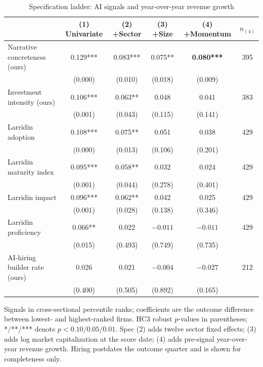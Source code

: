 \documentclass[11pt]{article}
\begin{document}
\begin{table}[t]
\centering
\begin{threeparttable}
\caption{Specification ladder: AI signals and year-over-year revenue growth}
\label{tab:ladder}
\small
\begin{tabular}{lccccc}
\toprule
 & (1) Univariate & (2) +Sector & (3) +Size & (4) +Momentum & $n_{(4)}$\\
\midrule
Narrative concreteness (ours) & 0.129*** & 0.083*** & 0.075** & \textbf{0.080***} & 395\\
 & (0.000) & (0.010) & (0.018) & (0.009) & \\
Investment intensity (ours) & 0.106*** & 0.063** & 0.048 & 0.041 & 383\\
 & (0.001) & (0.043) & (0.115) & (0.141) & \\
Larridin adoption & 0.108*** & 0.075** & 0.051 & 0.038 & 429\\
 & (0.000) & (0.013) & (0.106) & (0.201) & \\
Larridin maturity index & 0.095*** & 0.058** & 0.032 & 0.024 & 429\\
 & (0.001) & (0.044) & (0.278) & (0.401) & \\
Larridin impact & 0.096*** & 0.062** & 0.042 & 0.025 & 429\\
 & (0.001) & (0.028) & (0.138) & (0.346) & \\
Larridin proficiency & 0.066** & 0.022 & $-0.011$ & $-0.011$ & 429\\
 & (0.015) & (0.493) & (0.749) & (0.735) & \\
AI-hiring builder rate (ours) & 0.026 & 0.021 & $-0.004$ & $-0.027$ & 212\\
 & (0.400) & (0.505) & (0.892) & (0.165) & \\
\bottomrule
\end{tabular}
\begin{tablenotes}\footnotesize
\item Signals in cross-sectional percentile ranks; coefficients are the
outcome difference between lowest- and highest-ranked firms. HC3 robust
$p$-values in parentheses; */**/*** denote $p<0.10/0.05/0.01$. Spec (2) adds
twelve sector fixed effects; (3) adds log market capitalization at the score
date; (4) adds pre-signal year-over-year revenue growth. Hiring postdates the
outcome quarter and is shown for completeness only.
\end{tablenotes}
\end{threeparttable}
\end{table}
\end{document}
